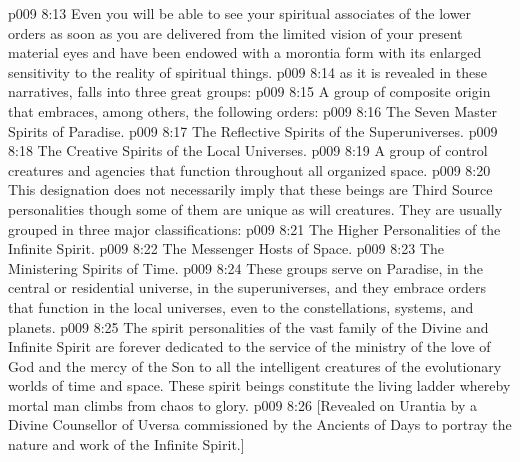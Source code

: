 \vs p009 8:13 Even you will be able to see your spiritual associates of the lower orders as soon as you are delivered from the limited vision of your present material eyes and have been endowed with a morontia form with its enlarged sensitivity to the reality of spiritual things.
\vs p009 8:14 \pc {} as it is revealed in these narratives, falls into three great groups:
\vs p009 8:15 \bibnobreakspace {} A group of composite origin that embraces, among others, the following orders:
\vs p009 8:16 \bibnobreakspace The Seven Master Spirits of Paradise.
\vs p009 8:17 \bibnobreakspace The Reflective Spirits of the Superuniverses.
\vs p009 8:18 \bibnobreakspace The Creative Spirits of the Local Universes.
\vs p009 8:19 \bibnobreakspace {} A group of control creatures and agencies that function throughout all organized space.
\vs p009 8:20 \bibnobreakspace {} This designation does not necessarily imply that these beings are Third Source personalities though some of them are unique as will creatures. They are usually grouped in three major classifications:
\vs p009 8:21 \bibnobreakspace The Higher Personalities of the Infinite Spirit.
\vs p009 8:22 \bibnobreakspace The Messenger Hosts of Space.
\vs p009 8:23 \bibnobreakspace The Ministering Spirits of Time.
\vs p009 8:24 These groups serve on Paradise, in the central or residential universe, in the superuniverses, and they embrace orders that function in the local universes, even to the constellations, systems, and planets.
\vs p009 8:25 The spirit personalities of the vast family of the Divine and Infinite Spirit are forever dedicated to the service of the ministry of the love of God and the mercy of the Son to all the intelligent creatures of the evolutionary worlds of time and space. These spirit beings constitute the living ladder whereby mortal man climbs from chaos to glory.
\vsetoff
\vs p009 8:26 [Revealed on Urantia by a Divine Counsellor of Uversa commissioned by the Ancients of Days to portray the nature and work of the Infinite Spirit.]
\quizlink
